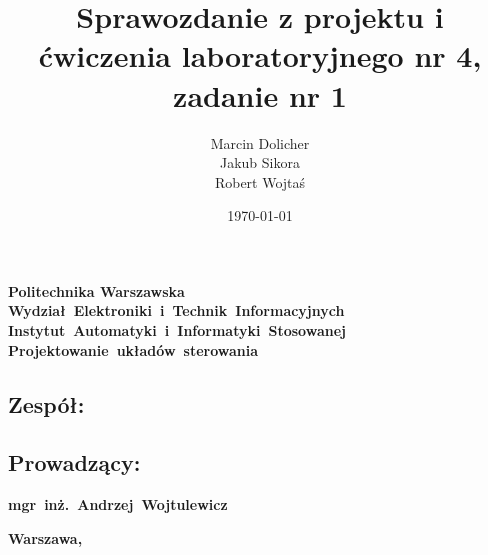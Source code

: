 \documentclass{mwrep}
\title{\bf Sprawozdanie z projektu i ćwiczenia laboratoryjnego nr 4, zadanie nr 1 \vskip 0.1cm}
\author{Marcin Dolicher \\ Jakub Sikora \\ Robert Wojtaś}
\date{\today}
\begin{document}
\frenchspacing
\pagestyle{uheadings}

\makeatletter
\renewcommand{\maketitle}{\begin{titlepage}
		\begin{center}{
				\LARGE {\bf Politechnika Warszawska}}\\
            \vspace{0.4cm}
            \leftskip-0.9cm
            {\LARGE {\bf \mbox{Wydział Elektroniki i Technik Informacyjnych}}}\\
            \vspace{0.2cm}
            {\LARGE {\bf \mbox{Instytut Automatyki i Informatyki Stosowanej}}}\\
            
            \vspace{5cm}
            \leftskip-1.3cm
			{\bf \Huge \mbox{Projektowanie układów sterowania} \vskip 0.1cm}
		\end{center}
		\vspace{0.1cm}

		\begin{center}
			{\bf \LARGE \@title}
		\end{center}

		\vspace{9cm}
		\begin{paracol}{2}
			\addtocontents{toc}{\protect\setcounter{tocdepth}{1}}
			\subsection*{Zespół:}
			\bf{ \Large{ \noindent\@author \par}}
			\addtocontents{toc}{\protect\setcounter{tocdepth}{2}}

			\switchcolumn \addtocontents{toc}{\protect\setcounter{tocdepth}{1}}
			\subsection*{Prowadzący:}
			\bf{\Large{\noindent \mbox{mgr inż. Andrzej Wojtulewicz}}}
			\addtocontents{toc}{\protect\setcounter{tocdepth}{2}}

		\end{paracol}
		\vspace*{\stretch{6}}
		\begin{center}
			\bf{\large{Warszawa, \@date\vskip 0.1cm}}
		\end{center}
	\end{titlepage}
}
\makeatother
\maketitle
\tableofcontents
\end{document}
